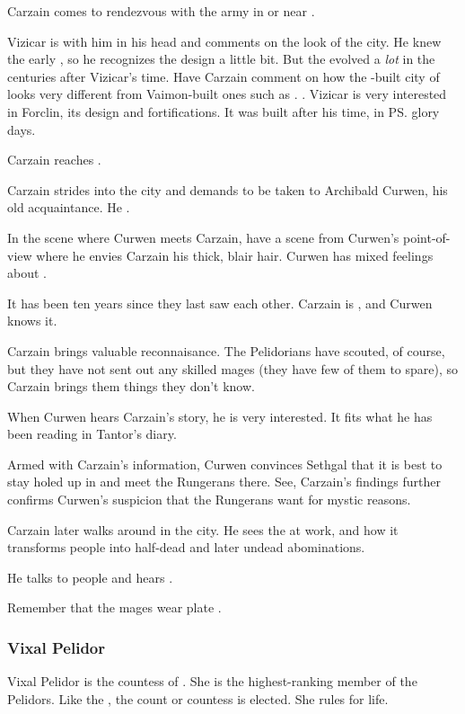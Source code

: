 Carzain comes to rendezvous with the army in or near \Forclin. 

Vizicar is with him in his head and comments on the look of the city. 
He knew the early \Ortaicans{}, so he recognizes the design a little bit. 
But the \Ortaicans{} evolved a \emph{lot} in the centuries after Vizicar's time. 
Have Carzain comment on how the \Ortaican-built city of \Forclin looks very different from Vaimon-built ones such as \Malcur. 
. 
Vizicar is very interested in Forclin, its design and fortifications. 
It was built after his time, in \ps{\Ortaica} glory days.

Carzain reaches \Forclin. 

Carzain strides into the city and demands to be taken to Archibald Curwen, his old acquaintance. 
He . 

In the scene where Curwen meets Carzain, have a scene from Curwen's point-of-view where he envies Carzain his thick, blair hair. 
Curwen has mixed feelings about . 

It has been ten years since they last saw each other. 
Carzain is , and Curwen knows it. 

Carzain brings valuable reconnaisance. 
The Pelidorians have scouted, of course, but they have not sent out any skilled mages (they have few of them to spare), so Carzain brings them things they don't know. 

When Curwen hears Carzain's story, he is very interested. 
It fits what he has been reading in Tantor's diary. 

Armed with Carzain's information, Curwen convinces Sethgal that it is best to stay holed up in \Forclin{} and meet the Rungerans there. 
See, Carzain's findings further confirms Curwen's suspicion that the Rungerans want \Forclin{} for mystic reasons. 

Carzain later walks around in the city. He sees the  at work, and how it transforms people into half-dead and later undead abominations. 

He talks to people and hears . 

Remember that the \ishrah{} mages wear plate \armour. 





\subsubsection{Vixal Pelidor}
Vixal Pelidor is the countess of \Forclin. 
She is the highest-ranking member of the \Forcliner{} Pelidors. 
Like the \rayuth, the count or countess is elected. 
She rules for life. 









